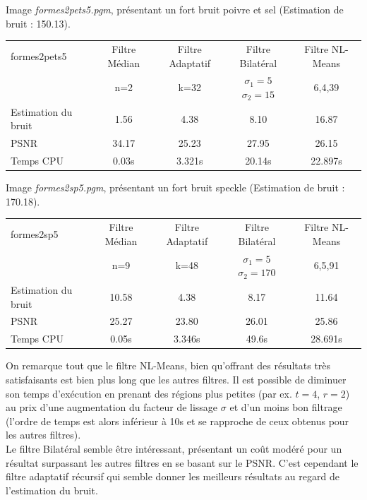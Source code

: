 \documentclass[a4,12pt]{article}
\begin{document}
\vspace{2em}

Image \textit{formes2pets5.pgm}, présentant un fort bruit poivre et sel (Estimation de bruit : 150.13).

\begin{center}
\begin{tabular}{|l||c|c|c|c|}
\hline
formes2pets5  & Filtre Médian & Filtre Adaptatif & Filtre Bilatéral & Filtre NL-Means\\
& n=2 & k=32 & $\sigma_1 = 5$ $\sigma_2 = 15$ & 6,4,39\\
\hline
Estimation du bruit
& 1.56
& 4.38
& 8.10
& 16.87\\
\hline
PSNR
& 34.17
& 25.23
& 27.95
& 26.15\\
\hline
Temps CPU
& 0.03s
& 3.321s
& 20.14s
& 22.897s\\
\hline
\end{tabular} 
\end{center}

\vspace{2em}

Image \textit{formes2sp5.pgm}, présentant un fort bruit speckle (Estimation de bruit : 170.18).

\begin{center}
\begin{tabular}{|l||c|c|c|c|}
\hline
formes2sp5  & Filtre Médian & Filtre Adaptatif & Filtre Bilatéral & Filtre NL-Means \\
& n=9 & k=48 & $\sigma_1 = 5$ $\sigma_2 = 170$ &6,5,91\\
\hline
Estimation du bruit
& 10.58
& 4.38
& 8.17
& 11.64\\
\hline
PSNR
& 25.27
& 23.80
& 26.01
& 25.86\\
\hline
Temps CPU
& 0.05s
& 3.346s
& 49.6s
& 28.691s\\
\hline
\end{tabular} 
\end{center}

On remarque tout que le filtre NL-Means, bien qu'offrant des résultats très satisfaisants est bien plus long que les autres filtres. Il est possible de diminuer son temps d'exécution en prenant des régions plus petites (par ex. $t=4$, $r=2$) au prix d'une augmentation du facteur de lissage $\sigma$ et d'un moins bon filtrage (l'ordre de temps est alors inférieur à 10s et se rapproche de ceux obtenus pour les autres filtres).\\

Le filtre Bilatéral semble être intéressant, présentant un coût modéré pour un résultat surpassant les autres filtres en se basant sur le PSNR. C'est cependant le filtre adaptatif récursif qui semble donner les meilleurs résultats au regard de l'estimation du bruit.\\
\end{document}
